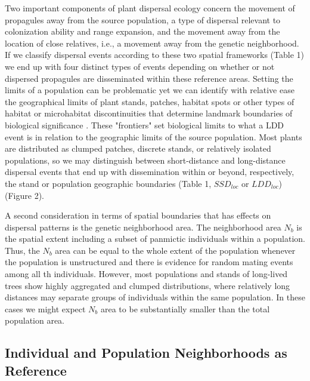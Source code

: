 \documentclass[a4paper, 12pt]{article}
\begin{document}
\begin{linenumbers}
Two important components of plant dispersal ecology concern the movement of propagules away from the source population, a type of dispersal relevant to colonization ability and range expansion, and the movement away from the location of close relatives, i.e., a movement away from the genetic neighborhood. If we classify dispersal events according to these two spatial frameworks (Table 1) we end up with four distinct types of events depending on whether or not dispersed propagules are disseminated within these reference areas. Setting the limits of a population can be problematic yet we can identify with relative ease the geographical limits of plant stands, patches, habitat spots or other types of habitat or microhabitat discontinuities that determine landmark boundaries of biological significance \citep[see][for further discussion of boundaries for dispersal]{Kinlan:2005fb}. These "frontiers" set biological limits to what a LDD event is in relation to the geographic limits of the source population. Most plants are distributed as clumped patches, discrete stands, or relatively isolated populations, so we may distinguish between short-distance and long-distance dispersal events that end up with dissemination within or beyond, respectively, the stand or population geographic boundaries (Table 1, $SSD_{loc}$ or $LDD_{loc}$) (Figure 2).  

A second consideration in terms of spatial boundaries that has effects on dispersal patterns is the genetic neighborhood area. The neighborhood area $N_b$ is the spatial extent including a subset of panmictic individuals within a population. Thus, the $N_b$ area can be equal to the whole extent of the population whenever the population is unstructured and there is evidence for random mating events among all th individuals. However, most populations and stands of long-lived trees show highly aggregated and clumped distributions, where relatively long distances may separate groups of individuals within the same population. In these cases we might expect $N_b$ area to be substantially smaller than the total population area. 

 


\subsection*{Individual and Population Neighborhoods as Reference}


\end{linenumbers}
\end{document}

